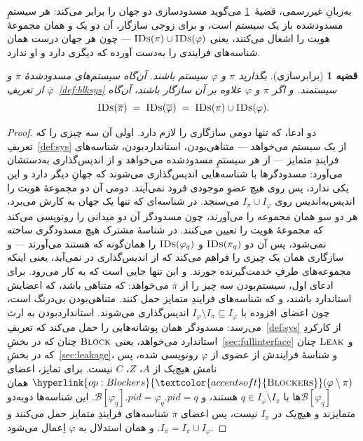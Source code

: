 \documentclass[10pt,oneside,openany]{book}
\newcommand{\PID}{\mathit{pid}}
\newcommand{\Blk}{\mathcal{B}}
\newcommand{\op}[1]{\textnormal{\textsc{#1}}}
\newcommand{\opl}[1]{\hyperlink{op:#1}{\textcolor{accentsoft}{\op{#1}}}}
\newcommand{\IDs}{\op{IDs}}
\theoremstyle{accentdef}
\theoremstyle{accentplain}
\newtheorem{theorem}[definition]{قضیه}
\begin{document}
به‌زبانِ غیررسمی، قضیهٔ~\ref{thm:blk} می‌گوید مسدودسازی دو جهان را برابر
می‌کند: هر سیستمِ مسدودشده باز یک سیستم است، و برای زوجی سازگار، آن دو یک و
همان مجموعهٔ هویت را اشغال می‌کنند، یعنی $\IDs(\pi) \cup \IDs(\varphi)$ ---
چون هر جهان درست همان شناسه‌های فرایندی را به‌دست آورده که دیگری دارد و او
ندارد.

\begin{theorem}[برابرسازی]\label{thm:blk}
بگذارید $\pi$ و $\varphi$ سیستم باشند. آن‌گاه سیستم‌های مسدودشدهٔ
$\overline{\pi}$ و $\overline{\varphi}$ از تعریفِ~\ref{def:blksys}
سیستمند. و اگر $\pi$ و $\varphi$ علاوه بر آن سازگار باشند، آن‌گاه
\[
  \IDs(\overline{\pi}) \;=\; \IDs(\overline{\varphi}) \;=\; \IDs(\pi) \cup \IDs(\varphi).
\]
\end{theorem}

\begin{proof}
دو ادعا، که تنها دومی سازگاری را لازم دارد. اولی آن سه چیزی را که
تعریفِ~\ref{def:sys} از یک سیستم می‌خواهد --- متناهی‌بودن،
استانداردبودن، شناسه‌های فرایندِ متمایز --- از هر سیستمِ مسدودشده می‌خواهد و
از اندیس‌گذاری به‌دستشان می‌آورد: مسدودگرها با شناسه‌هایی اندیس‌گذاری
می‌شوند که جهانِ دیگر دارد و این یکی ندارد، پس روی هیچ عضوِ موجودی فرود
نمی‌آیند. دومی آن دو مجموعهٔ هویت را اندیس‌به‌اندیس روی $I_\pi \cup
I_\varphi$ می‌سنجد. در شناسه‌ای که تنها یک جهان به کارش می‌برد، هر دو سو
همان مجموعه را می‌آورند، چون مسدودگر آن دو میدانی را رونویسی می‌کند که
مجموعهٔ هویت را تعیین می‌کنند. در شناسهٔ مشترک هیچ مسدودگری ساخته نمی‌شود،
پس آن دو $\IDs(\pi_q)$ و $\IDs(\varphi_q)$ را همان‌گونه که هستند می‌آورند
--- و سازگاری همان یک چیزی را فراهم می‌کند که از اندیس‌گذاری در نمی‌آید،
یعنی اینکه مجموعه‌های طرفِ خدمت‌گیرنده جورند. و این تنها جایی است که به کار
می‌رود.
برای ادعای اول، سیستم‌بودن سه چیز را از $\overline{\pi}$ می‌خواهد: که
متناهی باشد، که اعضایش استاندارد باشند، و که شناسه‌های فرایندِ متمایز حمل
کنند. متناهی‌بودن بی‌درنگ است، چون اعضای افزوده با $I_\varphi \setminus
I_\pi \subseteq I_\varphi$ اندیس‌گذاری می‌شوند. استانداردبودن به ارث
می‌رسد: مسدودگر همان پوشانه‌هایی را حمل می‌کند که تعریفِ~\ref{def:sys} از
کارکردِ استاندارد می‌خواهد، یعنی $\op{Block}$ چنان که در
بخشِ~\ref{sec:fullinterface} و $\op{Leak}$ چنان که در
بخشِ~\ref{sec:leakage}، و شناسهٔ فرایندش از عضوی از $\varphi$ رونویسی شده،
پس نامش هیچ‌یک از $A$، $Z$، $C$ نیست. برای تمایز، اعضای
$\opl{Blockers}(\varphi \setminus \pi)$ همان $\Blk[\varphi_q]$ها با $q \in
I_\varphi \setminus I_\pi$ هستند، و $\Blk[\varphi_q].\PID = \varphi_q.\PID
= q$. این شناسه‌ها دوبه‌دو متمایزند و هیچ‌یک در $I_\pi$ نیست، پس اعضای
$\overline{\pi}$ شناسه‌های فرایندِ متمایز حمل می‌کنند و
$I_{\overline{\pi}} = I_\pi \cup I_\varphi$. و همان استدلال به
$\overline{\varphi}$ اِعمال می‌شود.


\end{proof}
\end{document}

